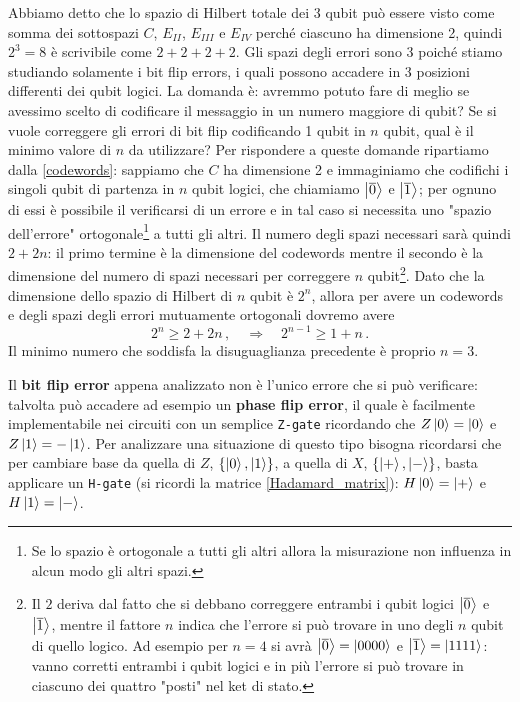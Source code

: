 \noindent Abbiamo detto che lo spazio di Hilbert totale dei 3 qubit può essere visto come somma dei sottospazi $C$, $E_{II}$, $E_{III}$ e $E_{IV}$ perché ciascuno ha dimensione 2, quindi $2^3 = 8$ è scrivibile come $2 + 2 + 2 + 2$. Gli spazi degli errori sono 3 poiché stiamo studiando solamente i bit flip errors, i quali possono accadere in 3 posizioni differenti dei qubit logici. La domanda è: avremmo potuto fare di meglio se avessimo scelto di codificare il messaggio in un numero maggiore di qubit? Se si vuole correggere gli errori di bit flip codificando 1 qubit in $n$ qubit, qual è il minimo valore di $n$ da utilizzare? Per rispondere a queste domande ripartiamo dalla \eqref{codewords}: sappiamo che $C$ ha dimensione 2 e immaginiamo che codifichi i singoli qubit di partenza in $n$ qubit logici, che chiamiamo $\ket{\overline{0}}$ e $\ket{\overline{1}}$; per ognuno di essi è possibile il verificarsi di un errore e in tal caso si necessita uno "spazio dell'errore" ortogonale\footnote{Se lo spazio è ortogonale a tutti gli altri allora la misurazione non influenza in alcun modo gli altri spazi.} a tutti gli altri. Il numero degli spazi necessari sarà quindi $ 2 + 2n$: il primo termine è la dimensione del codewords mentre il secondo è la dimensione del numero di spazi necessari per correggere $n$ qubit\footnote{Il $2$ deriva dal fatto che si debbano correggere entrambi i qubit logici $\ket{\overline{0}}$ e $\ket{\overline{1}}$, mentre il fattore $n$ indica che l'errore si può trovare in uno degli $n$ qubit di quello logico. Ad esempio per $n=4$ si avrà $\ket{\overline{0}} = \ket{0000}$ e $\ket{\overline{1}} = \ket{1111}$: vanno corretti entrambi i qubit logici e in più l'errore si può trovare in ciascuno dei quattro "posti" nel ket di stato.}. Dato che la dimensione dello spazio di Hilbert di $n$ qubit è $2^n$, allora per avere un codewords e degli spazi degli errori mutuamente ortogonali dovremo avere
\begin{equation*}
    2^n \geq 2 + 2 n \, , \quad \Rightarrow \quad 2^{n-1} \geq 1 + n \, .
\end{equation*}
Il minimo numero che soddisfa la disuguaglianza precedente è proprio $n = 3$.

\noindent Il \textbf{bit flip error} appena analizzato non è l'unico errore che si può verificare: talvolta può accadere ad esempio un \textbf{phase flip error}, il quale è facilmente implementabile nei circuiti con un semplice \texttt{Z-gate} ricordando che $Z \ket{0} = \ket{0}$ e $Z \ket{1} = -\ket{1}$. Per analizzare una situazione di questo tipo bisogna ricordarsi che per cambiare base da quella di $Z$, $\{ \ket{0}, \ket{1} \}$, a quella di $X$, $\{ \ket{+}, \ket{-} \}$, basta applicare un \texttt{H-gate} (si ricordi la matrice \eqref{Hadamard_matrix}): $H \ket{0} = \ket{+}$ e $H \ket{1} = \ket{-}$. 

